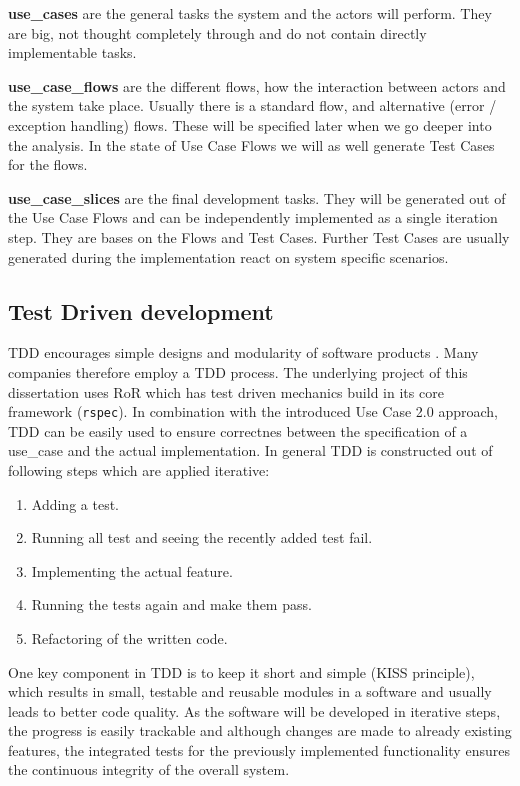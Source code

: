 \textbf{\Glspl{use_case}} are the general tasks the system and the actors will perform. They are big, not thought completely through and do not contain directly implementable tasks.

\textbf{\Glspl{use_case_flow}} are the different flows, how the interaction between actors and the system take place. Usually there is a standard flow, and alternative (error / exception handling) flows. These will be specified later when we go deeper into the analysis. In the state of Use Case Flows we will as well generate Test Cases for the flows. 

\textbf{\Glspl{use_case_slice}} are the final development tasks. They will be generated out of the Use Case Flows and can be independently implemented as a single iteration step. They are bases on the Flows and Test Cases. Further Test Cases are usually generated during the implementation react on system specific scenarios.


\subsection{Test Driven development}
\label{sec:tdd}
\Gls{TDD} encourages simple designs and modularity of software products \cite{tdd}. Many companies therefore employ a \gls{TDD} process. The underlying project of this dissertation uses \gls{RoR} which has test driven mechanics build in its core framework (\texttt{rspec}). In combination with the introduced Use Case 2.0 approach, \gls{TDD} can be easily used to ensure correctnes between the specification of a \gls{use_case} and the actual implementation. In general \gls{TDD} is constructed out of following steps which are applied iterative: 

\bigskip

\begin{enumerate}
	\item Adding a test.
	\item Running all test and seeing the recently added test fail.
	\item Implementing the actual feature.
	\item Running the tests again and make them pass.
	\item Refactoring of the written code.
\end{enumerate}

\bigskip

One key component in \gls{TDD} is to keep it short and simple (KISS principle), which results in small, testable and reusable modules in a software and usually leads to better code quality. As the software will be developed in iterative steps, the progress is easily trackable and although changes are made to already existing features, the integrated tests for the previously implemented functionality ensures the continuous integrity of the overall system.  


